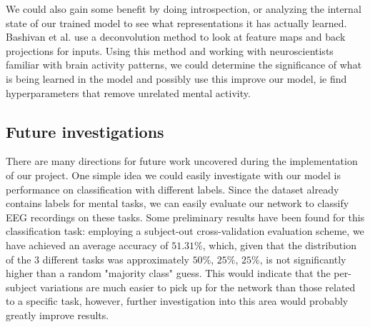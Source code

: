 \documentclass{article}
\begin{document}
We could also gain some benefit by doing introspection, or analyzing the internal state of our trained model to see what representations it has actually learned. Bashivan et al. use a deconvolution method to look at feature maps and back projections for inputs. Using this method and working with neuroscientists familiar with brain activity patterns, we could determine the significance of what is being learned in the model and possibly use this improve our model, ie find hyperparameters that remove unrelated mental activity.
\subsection{Future investigations}
There are many directions for future work uncovered during the implementation of our project. One simple idea we could easily investigate with our model is performance on classification with different labels. Since the dataset already contains labels for mental tasks, we can easily evaluate our network to classify EEG recordings on these tasks. Some preliminary results have been found for this classification task: employing a subject-out cross-validation evaluation scheme, we have achieved an average accuracy of $51.31\%$, which, given that the distribution of the 3 different tasks was approximately $50\%$, $25\%$, $25\%$, is not significantly higher than a random "majority class" guess. This would indicate that the per-subject variations are much easier to pick up for the network than those related to a specific task, however, further investigation into this area would probably greatly improve results.
\end{document}
